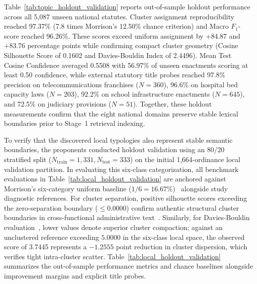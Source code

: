Table~\ref{tab:topic_holdout_validation} reports out-of-sample holdout performance across all 5,087 unseen national statutes. Cluster assignment reproducibility reached 97.37\% (7.8 times Morrison's 12.50\% chance criterion) and Macro $F_1$-score reached 96.26\%. These scores exceed uniform assignment by +84.87 and +83.76 percentage points while confirming compact cluster geometry (Cosine Silhouette Score of 0.1602 and Davies-Bouldin Index of 2.4496). Mean Test Cosine Confidence averaged 0.5508 with 56.97\% of unseen enactments scoring at least 0.50 confidence, while external statutory title probes reached 97.8\% precision on telecommunications franchises ($N=360$), 96.6\% on hospital bed capacity laws ($N=203$), 92.2\% on school infrastructure enactments ($N=645$), and 72.5\% on judiciary provisions ($N=51$). Together, these holdout measurements confirm that the eight national domains preserve stable lexical boundaries prior to Stage~1 retrieval indexing.

To verify that the discovered local typologies also represent stable semantic boundaries, the proponents conducted holdout validation using an 80/20 stratified split ($N_{\text{train}} = 1,331, N_{\text{test}} = 333$) on the initial 1,664-ordinance local validation partition. In evaluating this six-class categorization, all benchmark evaluations in Table~\ref{tab:local_holdout_validation} are anchored against Morrison's six-category uniform baseline ($1/6 = 16.67\%$)~\cite{morrison1969interpretation} alongside study diagnostic references. For cluster separation, positive silhouette scores exceeding the zero-separation boundary ($\le 0.0000$) confirm authentic structural cluster boundaries in cross-functional administrative text~\cite{rousseeuw1987silhouettes}. Similarly, for Davies-Bouldin evaluation~\cite{davies1979cluster}, lower values denote superior cluster compaction; against an unclustered reference exceeding $5.0000$ in the six-class local space, the observed score of 3.7445 represents a $-1.2555$ point reduction in cluster dispersion, which verifies tight intra-cluster scatter. Table~\ref{tab:local_holdout_validation} summarizes the out-of-sample performance metrics and chance baselines alongside improvement margins and explicit title probes.

